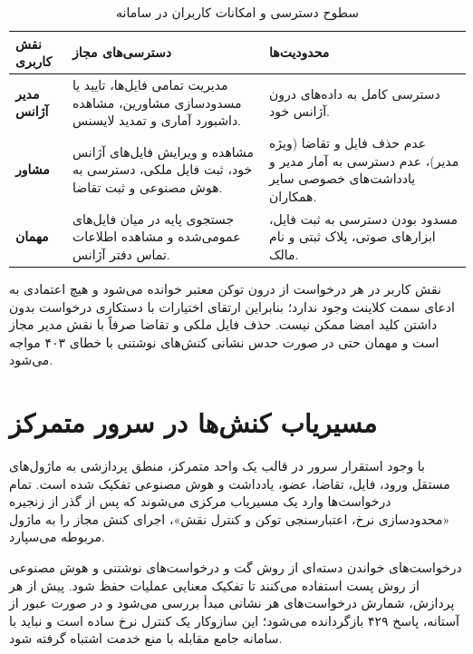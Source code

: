 \documentclass[11pt, a4paper]{report}
\makeatletter
\let\amlak@hline\hline
\let\hline\amlak@hline
\makeatother
\begin{document}
\begin{table}[htbp]
\centering
\caption{سطوح دسترسی و امکانات کاربران در سامانه}
\label{tab:rbac}
\renewcommand{\arraystretch}{1.5}
\begin{tabular}{|p{2.6cm}|p{5.5cm}|p{5.7cm}|}
\hline
\textbf{نقش کاربری} & \textbf{دسترسی‌های مجاز} & \textbf{محدودیت‌ها} \\ \hline
\textbf{مدیر آژانس} & مدیریت تمامی فایل‌ها، تایید یا مسدودسازی مشاورین، مشاهده داشبورد آماری و تمدید لایسنس. & دسترسی کامل به داده‌های درون آژانس خود. \\ \hline
\textbf{مشاور} & مشاهده و ویرایش فایل‌های آژانس خود، ثبت فایل ملکی، دسترسی به هوش مصنوعی و ثبت تقاضا. & عدم حذف فایل و تقاضا (ویژه مدیر)، عدم دسترسی به آمار مدیر و یادداشت‌های خصوصی سایر همکاران. \\ \hline
\textbf{مهمان} & جستجوی پایه در میان فایل‌های عمومی‌شده و مشاهده اطلاعات تماس دفتر آژانس. & مسدود بودن دسترسی به ثبت فایل، ابزارهای صوتی، پلاک ثبتی و نام مالک. \\ \hline
\end{tabular}
\end{table}

نقش کاربر در هر درخواست از درون توکن معتبر خوانده می‌شود و هیچ اعتمادی به ادعای سمت کلاینت وجود ندارد؛ بنابراین ارتقای اختیارات با دستکاری درخواست بدون داشتن کلید امضا ممکن نیست. حذف فایل ملکی و تقاضا صرفاً با نقش مدیر مجاز است و مهمان حتی در صورت حدس نشانی کنش‌های نوشتنی با خطای ۴۰۳ مواجه می‌شود.

\section{مسیریاب کنش‌ها در سرور متمرکز}
با وجود استقرار سرور در قالب یک واحد متمرکز، منطق پردازشی به ماژول‌های مستقل ورود، فایل، تقاضا، عضو، یادداشت و هوش مصنوعی تفکیک شده است. تمام درخواست‌ها وارد یک مسیریاب مرکزی می‌شوند که پس از گذر از زنجیره «محدودسازی نرخ، اعتبارسنجی توکن و کنترل نقش»، اجرای کنش مجاز را به ماژول مربوطه می‌سپارد.

درخواست‌های خواندن دسته‌ای از روش گت و درخواست‌های نوشتنی و هوش مصنوعی از روش پست استفاده می‌کنند تا تفکیک معنایی عملیات حفظ شود. پیش از هر پردازش، شمارش درخواست‌های هر نشانی مبدأ بررسی می‌شود و در صورت عبور از آستانه، پاسخ ۴۲۹ بازگردانده می‌شود؛ این سازوکار یک کنترل نرخ ساده است و نباید با سامانه جامع مقابله با منع خدمت اشتباه گرفته شود.
\end{document}
